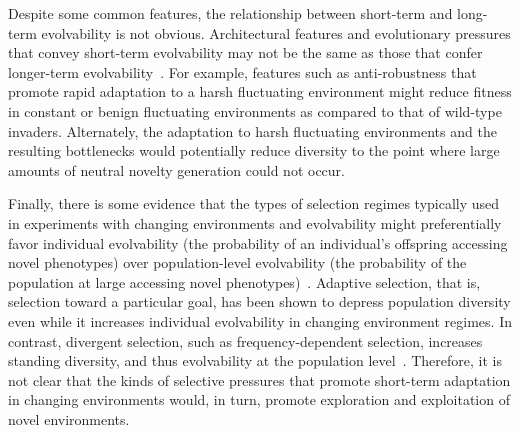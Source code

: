 \documentclass[10pt,letterpaper]{article}
\begin{document}
Despite some common features, the relationship between short-term and long-term evolvability is not obvious. Architectural features and evolutionary pressures that convey short-term evolvability may not be the same as those that confer longer-term evolvability~\cite{pigliucci_is_2008}. For example, features such as anti-robustness that promote rapid adaptation to a harsh fluctuating environment might reduce fitness in constant or benign fluctuating environments as compared to that of wild-type invaders. Alternately, the adaptation to harsh fluctuating environments and the resulting bottlenecks would potentially reduce diversity to the point where large amounts of neutral novelty generation could not occur. 

Finally, there is some evidence that the types of selection regimes typically used in experiments with changing environments and evolvability might preferentially favor individual evolvability (the probability of an individual's offspring accessing novel phenotypes) over population-level evolvability (the probability of the population at large accessing novel phenotypes)~\cite{wilder_reconciling_2015,lehman_critical_2016}. Adaptive selection, that is, selection toward a particular goal, has been shown to depress population diversity even while it increases individual evolvability in changing environment regimes. In contrast, divergent selection, such as frequency-dependent selection, increases standing diversity, and thus evolvability at the population level~\cite{wilder_reconciling_2015}. Therefore, it is not clear that the kinds of selective pressures that promote short-term adaptation in changing environments would, in turn, promote exploration and exploitation of novel environments.

\end{document}
